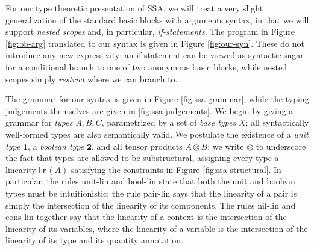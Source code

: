 \documentclass[acmsmall,screen,review]{acmart}
\newcommand{\mb}[1]{\ensuremath{\mathbf{#1}}}
\newcommand{\ms}[1]{\ensuremath{\mathsf{#1}}}
\newcommand{\rle}[1]{{\scriptsize\textsf{#1}}}
\begin{document}
For our type theoretic presentation of SSA, we will treat a very slight
generalization of the standard basic blocks with arguments syntax, in that we
will support \textit{nested scopes} and, in particular, \textit{if-statements}.
The program in Figure \ref{fig:bb-arg} translated to our syntax is given in
Figure \ref{fig:our-syn}. These do not introduce any new expressivity: an
if-statement can be viewed as syntactic sugar for a conditional branch to one of
two anonymous basic blocks, while nested scopes simply \textit{restrict} where
we can branch to. 

The grammar for our syntax is given in Figure \ref{fig:ssa-grammar}, while the
typing judgements themselves are given in \ref{fig:ssa-judgements}. We begin by
giving a grammar for \textit{types} \(A, B, C\), parametrized by a set of
\textit{base types} \(X\); all syntactically well-formed types are also
semantically valid. We postulate the existence of a \textit{unit type}
\(\mb{1}\), a \textit{boolean type} \(\mb{2}\), and all tensor products \(A
\otimes B\); we write \(\otimes\) to underscore the fact that types are allowed
to be substructural, assigning every type a linearity \(\ms{lin}(A)\) satisfying
the constraints in Figure \ref{fig:ssa-structural}. In particular, the rules
\rle{unit-lin} and \rle{bool-lin} state that both the unit and boolean types
must be intuitionistic; the rule \rle{pair-lin} says that the linearity of a
pair is simply the intersection of the linearity of its components. The rules
\rle{nil-lin} and \rle{cons-lin} together say that the linearity of a context is
the intersection of the linearity of its variables, where the linearity of a
variable is the intersection of the linearity of its type and its quantity
annotation.
\end{document}
